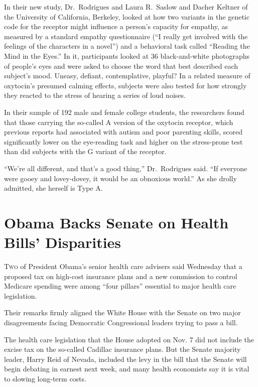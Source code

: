 ﻿\documentclass[12pt]{article}
\begin{document}
In their new study, Dr.~Rodrigues and Laura R.~Saslow and Dacher Keltner of the University of
California, Berkeley, looked at how two variants in the genetic code for the receptor might
influence a person's capacity for empathy, as measured by a standard empathy questionnaire (``I
really get involved with the feelings of the characters in a novel'') and a behavioral task called
``Reading the Mind in the Eyes.'' In it, participants looked at 36 black-and-white photographs of
people's eyes and were asked to choose the word that best described each subject's mood. Uneasy,
defiant, contemplative, playful? In a related measure of oxytocin's presumed calming effects,
subjects were also tested for how strongly they reacted to the stress of hearing a series of loud
noises.

In their sample of 192 male and female college students, the researchers found that those carrying
the so-called A version of the oxytocin receptor, which previous reports had associated with autism
and poor parenting skills, scored significantly lower on the eye-reading task and higher on the
stress-prone test than did subjects with the G variant of the receptor.

``We're all different, and that's a good thing,'' Dr.~Rodrigues said. ``If everyone were gooey and
lovey-dovey, it would be an obnoxious world.'' As she drolly admitted, she herself is Type A.

\section{Obama Backs Senate on Health Bills' Disparities}

\lettrine{T}{wo} of President Obama's senior health care advisers said
Wednesday that a proposed tax on high-cost insurance plans and a new commission to control Medicare
spending were among ``four pillars'' essential to major health care legislation.

Their remarks firmly aligned the White House with the Senate on two major disagreements facing
Democratic Congressional leaders trying to pass a bill.

The health care legislation that the House adopted on Nov. 7 did not include the excise tax on the
so-called Cadillac insurance plans. But the Senate majority leader, Harry Reid of Nevada, included
the levy in the bill that the Senate will begin debating in earnest next week, and many health
economists say it is vital to slowing long-term costs.
\end{document}
